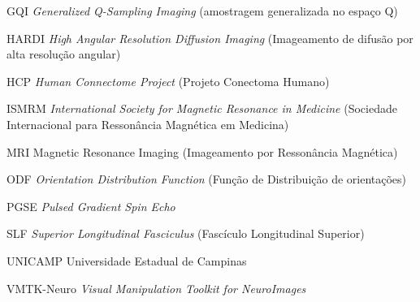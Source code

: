 \documentclass[
    12pt,                %
    oneside,            %
    a4paper,            %
    english,            %
    french,                %
    spanish,            %
    brazil                %
    ]{abntex2}
\begin{document}
\begin{siglas}
\item[GQI] \textit{Generalized Q-Sampling Imaging} (amostragem generalizada no espaço Q)

\item[HARDI] \textit{High Angular Resolution Diffusion Imaging} (Imageamento de difusão por alta resolução angular)

\item[HCP] \textit{Human Connectome Project} (Projeto Conectoma Humano)

\item[ISMRM]    \textit{International Society for Magnetic Resonance in Medicine} (Sociedade Internacional para Ressonância Magnética em Medicina)

\item[MRI] Magnetic Resonance Imaging (Imageamento por Ressonância Magnética)

\item[ODF] \textit{Orientation Distribution Function} (Função de Distribuição de orientações)

\item[PGSE] \textit{Pulsed Gradient Spin Echo}

\item[SLF] \textit{Superior Longitudinal Fasciculus} (Fascículo Longitudinal Superior)



\item[UNICAMP] Universidade Estadual de Campinas

\item[VMTK-Neuro] \textit{Visual Manipulation Toolkit for NeuroImages}









\end{siglas}





\tableofcontents*
\cleardoublepage



\textual
\end{document}
